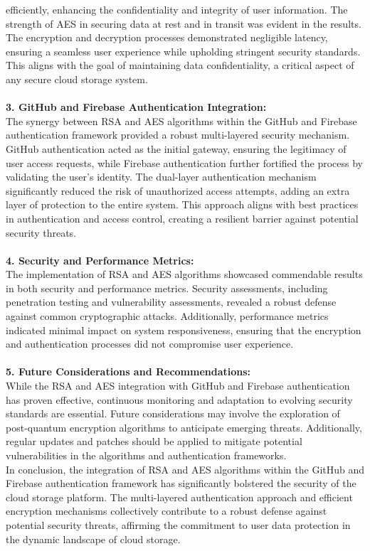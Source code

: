 efficiently, enhancing the confidentiality and integrity of user information.
The strength of AES in securing data at rest and in transit was evident in the results. The encryption
and decryption processes demonstrated negligible latency, ensuring a seamless user experience while
upholding stringent security standards. This aligns with the goal of maintaining data confidentiality, a
critical aspect of any secure cloud storage system.
\\
\\
\textbf{3. GitHub and Firebase Authentication Integration:}\\
The synergy between RSA and AES algorithms within the GitHub and Firebase authentication
framework provided a robust multi-layered security mechanism. GitHub authentication acted as the
initial gateway, ensuring the legitimacy of user access requests, while Firebase authentication further
fortified the process by validating the user's identity.
The dual-layer authentication mechanism significantly reduced the risk of unauthorized access
attempts, adding an extra layer of protection to the entire system. This approach aligns with best
practices in authentication and access control, creating a resilient barrier against potential security
threats. 
\\
\\
\textbf{4. Security and Performance Metrics: }\\
The implementation of RSA and AES algorithms showcased commendable results in both security
and performance metrics. Security assessments, including penetration testing and vulnerability
assessments, revealed a robust defense against common cryptographic attacks. Additionally,
performance metrics indicated minimal impact on system responsiveness, ensuring that the
encryption and authentication processes did not compromise user experience. 
\\
\\
\textbf{5. Future Considerations and Recommendations:}\\
While the RSA and AES integration with GitHub and Firebase authentication has proven effective,
continuous monitoring and adaptation to evolving security standards are essential. Future
considerations may involve the exploration of post-quantum encryption algorithms to anticipate
emerging threats. Additionally, regular updates and patches should be applied to mitigate potential
vulnerabilities in the algorithms and authentication frameworks.\\
In conclusion, the integration of RSA and AES algorithms within the GitHub and Firebase
authentication framework has significantly bolstered the security of the cloud storage platform. The
multi-layered authentication approach and efficient encryption mechanisms collectively contribute to
a robust defense against potential security threats, affirming the commitment to user data protection in
the dynamic landscape of cloud storage. 

\\
\\